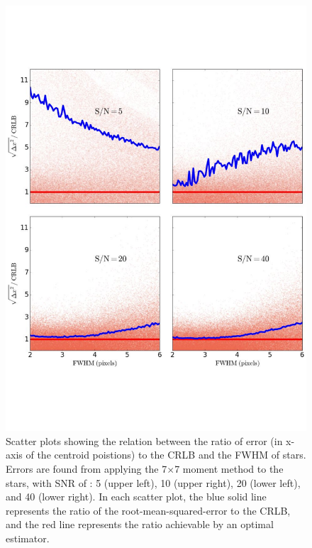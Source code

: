 \begin{figure}[p]~\\
\begin{center}
\includegraphics[width=0.65\linewidth]{figures/centroiding/new_fwhm_moment.pdf}
\caption{Scatter plots showing the relation between the ratio of error (in x-axis of the centroid poistions) to the CRLB and the FWHM of stars.
Errors are found from applying the 7$\times$7 moment method to the stars, with SNR  of : 5 (upper left), 10 (upper right), 20 (lower left), and 40 (lower right). In each scatter plot, the blue solid line represents the ratio of the root-mean-squared-error to the CRLB, and the red line represents the ratio achievable by an optimal estimator.}\label{8}
\end{center}
\end{figure}

%
%
%



